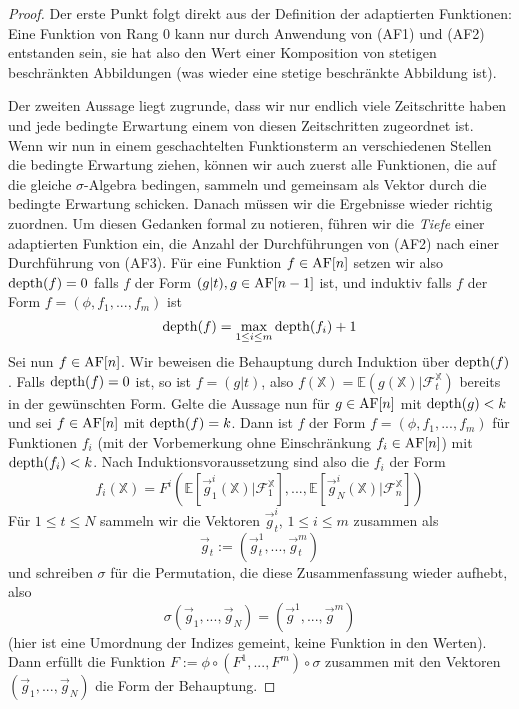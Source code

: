 \begin{proof}
Der erste Punkt folgt direkt aus der Definition der adaptierten Funktionen: Eine Funktion von Rang 0 kann nur durch Anwendung von (AF1) und (AF2) entstanden sein, sie hat also den Wert einer Komposition von stetigen beschränkten Abbildungen (was wieder eine stetige beschränkte Abbildung ist). 

Der zweiten Aussage liegt zugrunde, dass wir nur endlich viele Zeitschritte haben und jede bedingte Erwartung einem von diesen Zeitschritten zugeordnet ist. Wenn wir nun in einem geschachtelten Funktionsterm an verschiedenen Stellen die bedingte Erwartung ziehen, können wir auch zuerst alle Funktionen, die auf die gleiche $\sigma$-Algebra bedingen, sammeln und gemeinsam als Vektor durch die bedingte Erwartung schicken. Danach müssen wir die Ergebnisse wieder richtig zuordnen. Um diesen Gedanken formal zu notieren, führen wir die \emph{Tiefe} einer adaptierten Funktion ein, die Anzahl der Durchführungen von (AF2) nach einer Durchführung von (AF3). Für eine Funktion $f \in \operatorname{AF}[n]$ setzen wir also $\operatorname{depth}(f)=0$ falls $f$ der Form $(g \vert t), g \in \operatorname{AF}[n-1]$ ist, und induktiv falls $f$ der Form $f=(\phi, f_1,...,f_m)$ ist
$$\operatorname{depth}(f) = \max_{1\leq i \leq m} \operatorname{depth}(f_i) + 1$$
Sei nun $f \in \operatorname{AF}[n]$. Wir beweisen die Behauptung durch Induktion über $\operatorname{depth}(f)$. Falls $\operatorname{depth}(f)=0$ ist, so ist $f = (g \vert t)$, also $f(\mathbb{X}) = \mathbb{E}(g(\mathbb{X})\vert \mathcal{F}_t^\mathbb{X})$ bereits in der gewünschten Form. Gelte die Aussage nun für $g \in \operatorname{AF}[n]$ mit $\operatorname{depth}(g) < k$ und sei $f\in\operatorname{AF}[n]$ mit $\operatorname{depth}(f)=k$. Dann ist $f$ der Form $f=(\phi, f_1,...,f_m)$ für Funktionen $f_i$ (mit der Vorbemerkung ohne Einschränkung $f_i \in \operatorname{AF}[n]$) mit $\operatorname{depth}(f_i)<k$. Nach Induktionsvoraussetzung sind also die $f_i$ der Form
$$f_i(\mathbb{X}) = F^i(\mathbb{E}[\vec{g}_1^i(\mathbb{X}) \vert \mathcal{F}_1^\mathbb{X}],...,\mathbb{E}[\vec{g}_N^i(\mathbb{X}) \vert \mathcal{F}_n^\mathbb{X}])$$
Für $1\leq t \leq N$ sammeln wir die Vektoren $\vec{g}_t^i$, $1 \leq i \leq m$ zusammen als
$$\vec{g}_t:=(\vec{g}_t^1,...,\vec{g}_t^m)$$
und schreiben $\sigma$ für die Permutation, die diese Zusammenfassung wieder aufhebt, also
$$\sigma(\vec{g}_1,...,\vec{g}_N) = (\vec{g}^1,...,\vec{g}^m)$$
(hier ist eine Umordnung der Indizes gemeint, keine Funktion in den Werten). Dann erfüllt die Funktion $F := \phi \circ (F^1,...,F^m) \circ \sigma$ zusammen mit den Vektoren $(\vec{g}_1,...,\vec{g}_N)$ die Form der Behauptung.
\end{proof}

